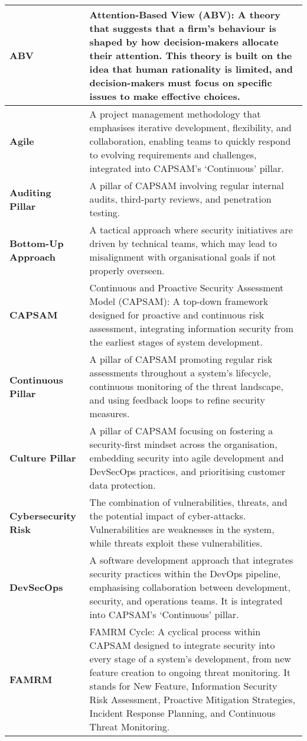 \begin{longtable}{|>{\raggedright}m{4cm}|m{10cm}|}
    \textbf{ABV} & Attention-Based View (ABV): A theory that suggests that a firm's behaviour is shaped by how decision-makers allocate their attention. This theory is built on the idea that human rationality is limited, and decision-makers must focus on specific issues to make effective choices. \\ \hline
    \textbf{Agile} & A project management methodology that emphasises iterative development, flexibility, and collaboration, enabling teams to quickly respond to evolving requirements and challenges, integrated into CAPSAM’s ‘Continuous’ pillar. \\ \hline
    \textbf{Auditing Pillar} & A pillar of CAPSAM involving regular internal audits, third-party reviews, and penetration testing. \\ \hline
    \textbf{Bottom-Up Approach} & A tactical approach where security initiatives are driven by technical teams, which may lead to misalignment with organisational goals if not properly overseen. \\ \hline
    \textbf{CAPSAM} & Continuous and Proactive Security Assessment Model (CAPSAM): A top-down framework designed for proactive and continuous risk assessment, integrating information security from the earliest stages of system development. \\ \hline
    \textbf{Continuous Pillar} & A pillar of CAPSAM promoting regular risk assessments throughout a system's lifecycle, continuous monitoring of the threat landscape, and using feedback loops to refine security measures. \\ \hline
    \textbf{Culture Pillar} & A pillar of CAPSAM focusing on fostering a security-first mindset across the organisation, embedding security into agile development and DevSecOps practices, and prioritising customer data protection. \\ \hline
    \textbf{Cybersecurity Risk} & The combination of vulnerabilities, threats, and the potential impact of cyber-attacks. Vulnerabilities are weaknesses in the system, while threats exploit these vulnerabilities. \\ \hline
    \textbf{DevSecOps} & A software development approach that integrates security practices within the DevOps pipeline, emphasising collaboration between development, security, and operations teams. It is integrated into CAPSAM’s ‘Continuous’ pillar. \\ \hline
    \textbf{FAMRM} & FAMRM Cycle: A cyclical process within CAPSAM designed to integrate security into every stage of a system's development, from new feature creation to ongoing threat monitoring. It stands for New Feature, Information Security Risk Assessment, Proactive Mitigation Strategies, Incident Response Planning, and Continuous Threat Monitoring. \\ \hline

\end{longtable}
